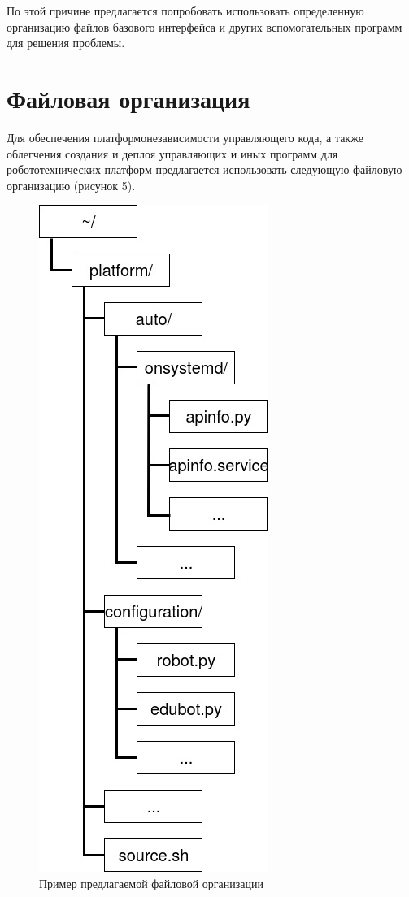 \documentclass[a4paper,12pt]{article}
\begin{document}
По этой причине предлагается попробовать использовать определенную организацию файлов базового интерфейса и других вспомогательных программ для решения проблемы. 

\section{Файловая организация}
Для обеспечения платформонезависимости управляющего кода, а также облегчения создания и деплоя управляющих и иных программ для робототехнических платформ предлагается использовать следующую файловую организацию (рисунок 5).

\begin{figure}[h!]
\centering
\includegraphics[scale=0.8]{fileorg.jpg}
\caption{Пример предлагаемой файловой организации}
\label{fig:organization}
\end{figure}
\end{document}

